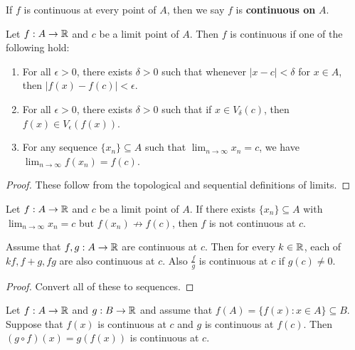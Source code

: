 \begin{definition}
  If $f$ is continuous at every point of $A$, then
  we say $f$ is \textbf{continuous on} $A$.
\end{definition}

\begin{theorem}
  Let $f : A \to \mathbb{R}$ and $c$ be a limit point of $A$. Then
  $f$ is continuous if one of the following hold:
  \begin{enumerate}
    \item For all $\epsilon > 0$, there exists $\delta > 0$ such
      that whenever $|x - c| < \delta$ for $x \in A$, then
      $|f(x) - f(c)| < \epsilon$.
    \item For all $\epsilon > 0$, there exists $\delta > 0$
      such that if $x \in V_\delta(c)$, then
      $f(x) \in V_\epsilon(f(x))$.
    \item For any sequence $\{x_n\} \subseteq A$ such that
      $\lim_{n \to \infty} x_n = c$, we have
      $\lim_{n \to \infty} f(x_n) = f(c)$.
  \end{enumerate}
\end{theorem}

\begin{proof}
  These follow from the topological and sequential definitions
  of limits.
\end{proof}

\begin{corollary}
  Let $f : A \to \mathbb{R}$ and $c$ be a limit point of $A$. If there
  exists $\{x_n\} \subseteq A$ with $\lim_{n \to \infty} x_n = c$
  but $f(x_n) \not\to f(c)$, then $f$ is not continuous at $c$.
\end{corollary}

\begin{theorem}
  Assume that $f, g : A \to \mathbb{R}$ are continuous at $c$. Then for
  every $k \in \mathbb{R}$, each of $kf, f + g, fg$ are also continuous at
  $c$. Also $\frac{f}{g}$ is continuous at $c$ if $g(c) \ne 0$.
\end{theorem}

\begin{proof}
  Convert all of these to sequences.
\end{proof}

\begin{theorem}
  Let $f : A \to \mathbb{R}$ and $g : B \to \mathbb{R}$ and assume that
  $f(A) = \{f(x) : x \in A\} \subseteq B$. Suppose that $f(x)$ is
  continuous at $c$ and $g$ is continuous at $f(c)$. Then
  $(g \circ f)(x) = g(f(x))$ is continuous at $c$.
\end{theorem}

